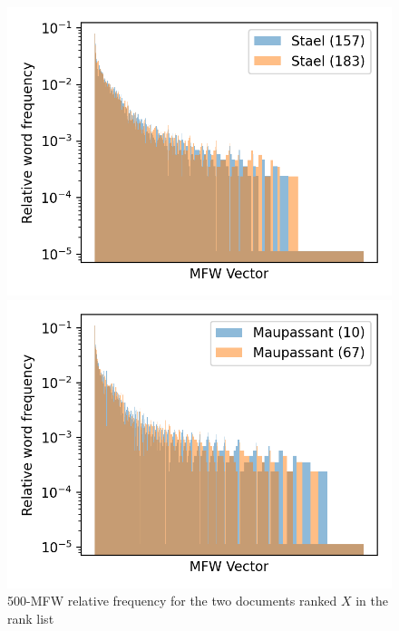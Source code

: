 \begin{figure}
  \centering
  \caption{500-MFW relative frequency for the two documents ranked $X$ in the rank list}

  \label{fig:mfw_vector_first_rl}
  \includegraphics[width=\linewidth]{img/mfw_vector_first_rl.png}

  \label{fig:mfw_vector_first_last_rl}
  \includegraphics[width=\linewidth]{img/mfw_vector_first_last_rl.png}


\end{figure}
